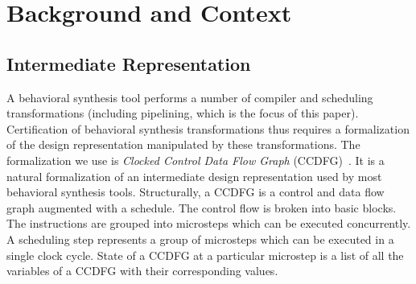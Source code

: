 \section{Background and Context}
\label{sec:background}



\subsection{Intermediate Representation}
\label{subsec:ir}

A behavioral synthesis tool performs a number of compiler
and scheduling transformations (including pipelining, which is the focus of this paper). Certification of behavioral
synthesis transformations thus requires a formalization of
the design representation manipulated by these
transformations. The formalization we use is {\em Clocked
  Control Data Flow Graph} (CCDFG)~\cite{rhcxy:atva-09}. It
is a natural formalization of an intermediate design
representation used by most behavioral synthesis tools.
Structurally, a CCDFG is a control and data flow graph augmented with a schedule.
The control flow is broken into basic blocks. The instructions are grouped into microsteps which can be executed concurrently. A scheduling step represents a group of microsteps which can be executed in a single clock cycle. State of a CCDFG at a particular microstep is a list of all the variables of a CCDFG with their corresponding values. 

